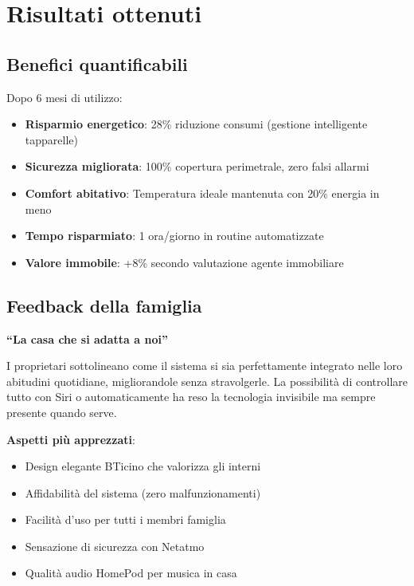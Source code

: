 \section{Risultati ottenuti}

\subsection{Benefici quantificabili}

Dopo 6 mesi di utilizzo:

\begin{itemize}
    \item \textbf{Risparmio energetico}: 28\% riduzione consumi (gestione intelligente tapparelle)
    \item \textbf{Sicurezza migliorata}: 100\% copertura perimetrale, zero falsi allarmi
    \item \textbf{Comfort abitativo}: Temperatura ideale mantenuta con 20\% energia in meno
    \item \textbf{Tempo risparmiato}: 1 ora/giorno in routine automatizzate
    \item \textbf{Valore immobile}: +8\% secondo valutazione agente immobiliare
\end{itemize}

\subsection{Feedback della famiglia}

\textbf{``La casa che si adatta a noi''}

I proprietari sottolineano come il sistema si sia perfettamente integrato nelle loro abitudini quotidiane, migliorandole senza stravolgerle. La possibilità di controllare tutto con Siri o automaticamente ha reso la tecnologia invisibile ma sempre presente quando serve.

\textbf{Aspetti più apprezzati}:
\begin{itemize}
    \item Design elegante BTicino che valorizza gli interni
    \item Affidabilità del sistema (zero malfunzionamenti)
    \item Facilità d'uso per tutti i membri famiglia
    \item Sensazione di sicurezza con Netatmo
    \item Qualità audio HomePod per musica in casa
\end{itemize}

